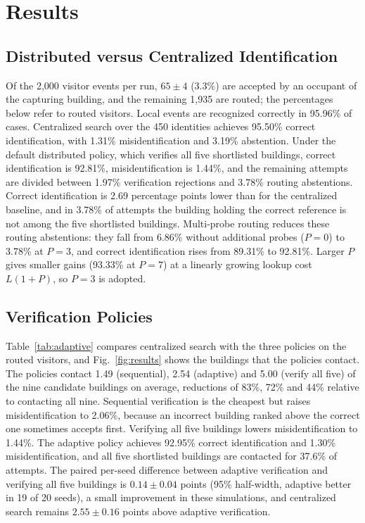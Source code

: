 \documentclass[pdflatex,sn-mathphys-num]{sn-jnl}%
\theoremstyle{thmstyleone}%
\theoremstyle{thmstyletwo}%
\theoremstyle{thmstylethree}%
\begin{document}

\section{Results}
\label{sec:results}

\subsection{Distributed versus Centralized Identification}

Of the 2,000 visitor events per run, $65\pm4$ (3.3\%) are accepted by an occupant of the capturing building, and the remaining 1,935 are routed; the percentages below refer to routed visitors. Local events are recognized correctly in 95.96\% of cases. Centralized search over the 450 identities achieves 95.50\% correct identification, with 1.31\% misidentification and 3.19\% abstention. Under the default distributed policy, which verifies all five shortlisted buildings, correct identification is 92.81\%, misidentification is 1.44\%, and the remaining attempts are divided between 1.97\% verification rejections and 3.78\% routing abstentions. Correct identification is 2.69 percentage points lower than for the centralized baseline, and in 3.78\% of attempts the building holding the correct reference is not among the five shortlisted buildings. Multi-probe routing reduces these routing abstentions: they fall from 6.86\% without additional probes ($P=0$) to 3.78\% at $P=3$, and correct identification rises from 89.31\% to 92.81\%. Larger $P$ gives smaller gains (93.33\% at $P=7$) at a linearly growing lookup cost $L(1+P)$, so $P=3$ is adopted.

\subsection{Verification Policies}

Table~\ref{tab:adaptive} compares centralized search with the three policies on the routed visitors, and Fig.~\ref{fig:results} shows the buildings that the policies contact. The policies contact 1.49 (sequential), 2.54 (adaptive) and 5.00 (verify all five) of the nine candidate buildings on average, reductions of 83\%, 72\% and 44\% relative to contacting all nine. Sequential verification is the cheapest but raises misidentification to 2.06\%, because an incorrect building ranked above the correct one sometimes accepts first. Verifying all five buildings lowers misidentification to 1.44\%. The adaptive policy achieves 92.95\% correct identification and 1.30\% misidentification, and all five shortlisted buildings are contacted for 37.6\% of attempts. The paired per-seed difference between adaptive verification and verifying all five buildings is $0.14\pm0.04$ points (95\% half-width, adaptive better in 19 of 20 seeds), a small improvement in these simulations, and centralized search remains $2.55\pm0.16$ points above adaptive verification.
\end{document}
